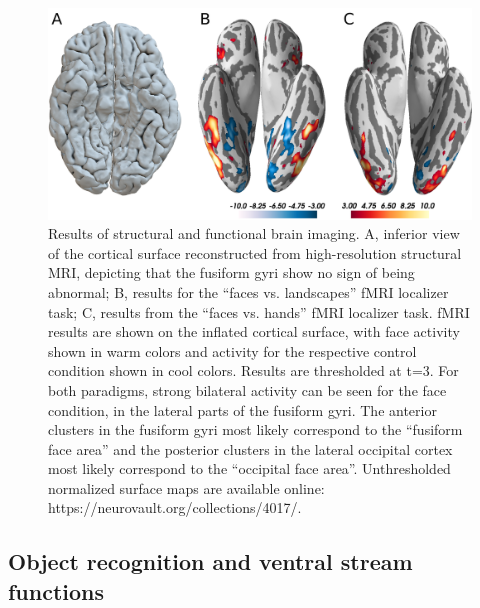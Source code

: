 \documentclass[fleqn,10pt]{SelfArx} %
\begin{document}
\begin{figure}[htbp]
	
	\renewcommand{\familydefault}{\sfdefault}\normalfont
	\centering
	\includegraphics[width=\columnwidth]{../reports/figures/brain_main_figure.png}
	\vspace*{-3mm}
  		\caption{Results of structural and functional brain imaging. A, inferior view of the cortical surface reconstructed from high-resolution structural MRI, depicting that the fusiform gyri show no sign of being abnormal; B, results for the “faces vs. landscapes” fMRI localizer task; C, results from the “faces vs. hands” fMRI localizer task. fMRI results are shown on the inflated cortical surface, with face activity shown in warm colors and activity for the respective control condition shown in cool colors. Results are thresholded at t=3. For both paradigms, strong bilateral activity can be seen for the face condition, in the lateral parts of the fusiform gyri. The anterior clusters in the fusiform gyri most likely correspond to the “fusiform face area” and the posterior clusters in the lateral occipital cortex most likely correspond to the “occipital face area”. Unthresholded normalized surface maps are available online: https://neurovault.org/collections/4017/.}%
  		\label{fig:brain}
	
\end{figure}
  
\subsection*{Object recognition and ventral stream functions}
\end{document}
